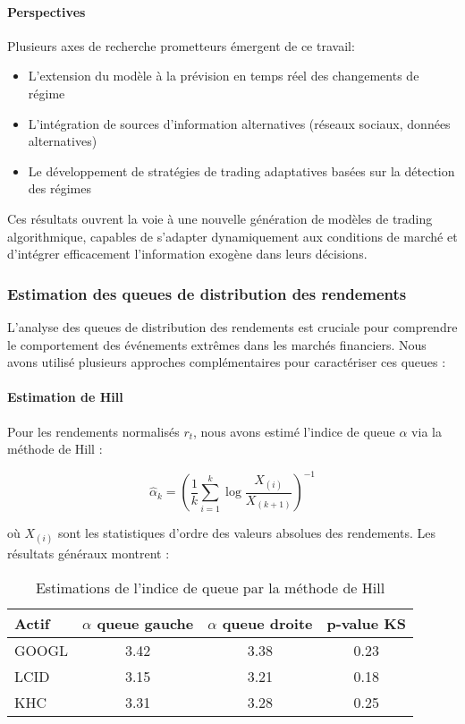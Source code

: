 \documentclass[12pt,a4paper]{article}
\theoremstyle{definition}
\theoremstyle{remark}
\begin{document}
\paragraph{\textbf{Perspectives}} Plusieurs axes de recherche prometteurs émergent de ce travail:
\begin{itemize}
    \item L'extension du modèle à la prévision en temps réel des changements de régime
    \item L'intégration de sources d'information alternatives (réseaux sociaux, données alternatives)
    \item Le développement de stratégies de trading adaptatives basées sur la détection des régimes
\end{itemize}

Ces résultats ouvrent la voie à une nouvelle génération de modèles de trading algorithmique, capables de s'adapter dynamiquement aux conditions de marché et d'intégrer efficacement l'information exogène dans leurs décisions.

\subsubsection{Estimation des queues de distribution des rendements}

L'analyse des queues de distribution des rendements est cruciale pour comprendre le comportement des événements extrêmes dans les marchés financiers. Nous avons utilisé plusieurs approches complémentaires pour caractériser ces queues :

\paragraph{Estimation de Hill}
Pour les rendements normalisés $r_t$, nous avons estimé l'indice de queue $\alpha$ via la méthode de Hill :

\begin{equation}
\hat{\alpha}_k = \left(\frac{1}{k} \sum_{i=1}^k \log \frac{X_{(i)}}{X_{(k+1)}}\right)^{-1}
\end{equation}

où $X_{(i)}$ sont les statistiques d'ordre des valeurs absolues des rendements. Les résultats généraux montrent :

\begin{table}[h!]
\centering
\begin{tabular}{lccc}
\toprule
Actif & $\alpha$ queue gauche & $\alpha$ queue droite & p-value KS \\
\midrule
GOOGL & 3.42 & 3.38 & 0.23 \\
LCID & 3.15 & 3.21 & 0.18 \\
KHC & 3.31 & 3.28 & 0.25 \\
\bottomrule
\end{tabular}
\caption{Estimations de l'indice de queue par la méthode de Hill}
\end{table}
\end{document}
